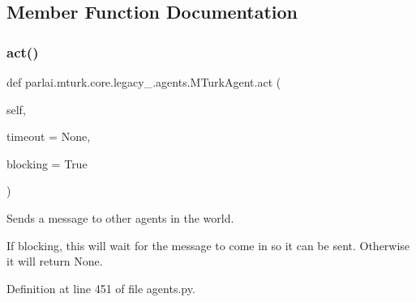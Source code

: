 \subsection{Member Function Documentation}
\mbox{\label{classparlai_1_1mturk_1_1core_1_1legacy__2018_1_1agents_1_1MTurkAgent_a8213027b870c39332a5431dbcd6c69b9}} 
\subsubsection{\texorpdfstring{act()}{act()}}
{\footnotesize\ttfamily def parlai.\+mturk.\+core.\+legacy\+\_.\+agents.\+M\+Turk\+Agent.\+act (\begin{DoxyParamCaption}\item[{}]{self,  }\item[{}]{timeout = {\ttfamily None},  }\item[{}]{blocking = {\ttfamily True} }\end{DoxyParamCaption})}

\begin{DoxyVerb}Sends a message to other agents in the world.

If blocking, this will wait for the message to come in so it can be sent.
Otherwise it will return None.
\end{DoxyVerb}
 

Definition at line 451 of file agents.\+py.


